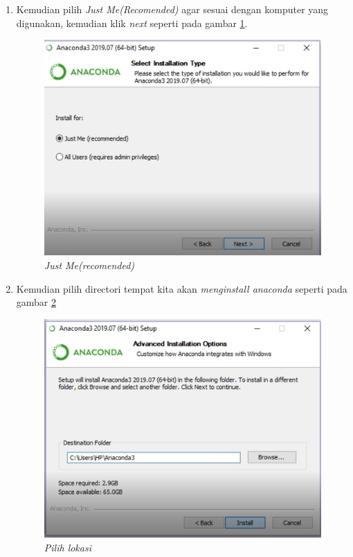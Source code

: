 \begin{enumerate}
\item Kemudian pilih \textit{Just Me(Recomended)} agar sesuai dengan komputer yang digunakan, kemudian klik \textit{next} seperti pada gambar \ref{Figureanaconda4}.

\begin{figure}[H]
    \centerline{\includegraphics[scale=0.75]{figures/5}}
    \caption{\textit{Just Me(recomended)}}
    \label{Figureanaconda4}
\end{figure}


\item Kemudian pilih directori tempat kita akan \textit{menginstall anaconda} seperti pada gambar \ref{Figureanaconda5}

\begin{figure}[H]
    \centering
    \includegraphics[scale=0.75]{figures/6}
    \caption{\textit{Pilih lokasi}}
    \label{Figureanaconda5}
\end{figure}


\end{enumerate}
